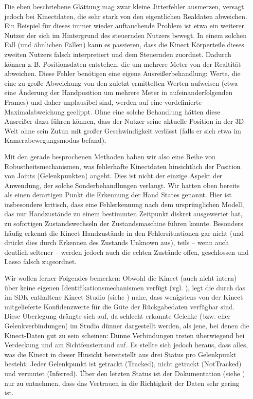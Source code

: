 	Die eben beschriebene Glättung mag zwar kleine Jitterfehler ausmerzen, versagt jedoch bei Kinectdaten, die sehr stark von den eigentlichen Realdaten abweichen. Ein Beispiel für dieses immer wieder auftauchende Problem ist etwa ein weiterer Nutzer der sich im Hintergrund des steuernden Nutzers bewegt. In einem solchen Fall (und ähnlichen Fällen) kann es passieren, dass die Kinect Körperteile dieses zweiten Nutzers falsch interpretiert und dem Steuernden zuordnet. Dadurch können z.\,B. Positionsdaten entstehen, die um mehrere Meter von der Realtität abweichen. Diese Fehler benötigen eine eigene Ausreißerbehandlung: Werte, die eine zu große Abweichung von den zuletzt ermittelten Werten aufweisen (etwa eine Änderung der Handposition um mehrere Meter in aufeinanderfolgenden Frames) und daher unplausibel sind, werden auf eine vordefinierte Maximalabweichung geclippt. Ohne eine solche Behandlung hätten diese Ausreißer dazu führen können, dass der Nutzer seine aktuelle Position in der 3D-Welt ohne sein Zutun mit großer Geschwindigkeit verlässt (falls er sich etwa im Kamerabewegungsmodus befand).\par 
	Mit den gerade besprochenen Methoden haben wir also eine Reihe von Robustheitsmechanismen, was fehlerhafte Kinectdaten hinsichtlich der Position von Joints (Gelenkpunkten) angeht. Dies ist nicht der einzige Aspekt der Anwendung, der solche Sonderbehandlungen verlangt. Wir hatten oben bereits als einen derartigen Punkt die Erkennung der \glqq Hand States\grqq{} genannt. Hier ist insbesondere kritisch, dass eine Fehlerkennung nach dem ursprünglichen Modell, das nur Handzustände zu einem bestimmten Zeitpunkt diskret ausgewertet hat, zu sofortigen Zustandswechseln der Zustandsmaschine führen konnte. Besonders häufig erkennt die Kinect Handzustände in den Fehlersituationen gar nicht (und drückt dies durch \glqq Erkennen\grqq{} des Zustands \glqq{}Unknown\grqq{} aus), teils -- wenn auch deutlich seltener -- werden jedoch auch die \glqq echten\grqq{} Zustände \glqq offen\grqq{}, \glqq geschlossen\grqq{} und \glqq Lasso\grqq{} falsch zugeordnet.\par 
	Wir wollen ferner Folgendes bemerken: Obwohl die Kinect (auch nicht intern) über keine eigenen Identifikationsmechanismen verfügt (vgl. \cite{bodyprop}), legt die durch das im SDK enthaltene Kinect Studio (siehe \cite{kinectsdk}) nahe, dass wenigstens von der Kinect mitgelieferte Konfidenzwerte für die Güte der Rückgabedaten verfügbar sind. Diese Überlegung drängte sich auf, da schlecht erkannte Gelenke (bzw. eher Gelenkverbindungen) im Studio dünner dargestellt werden, als jene, bei denen die Kinect-Daten gut zu sein scheinen: Dünne Verbindungen treten überwiegend bei Verdeckung und am Sichtfensterrand auf. Es stellte sich jedoch heraus, dass alles, was die Kinect in dieser Hinsicht bereitstellt aus drei Status pro Gelenkpunkt besteht: Jeder Gelenkpunkt ist getrackt (\glqq Tracked\grqq), nicht getrackt (\glqq NotTracked\grqq) und vermutet (\glqq Inferred\grqq). Über den letzten Status ist der Dokumentation (siehe \cite{trackingstate}) nur zu entnehmen, dass das Vertrauen in die Richtigkeit der Daten \glqq sehr gering\grqq{} ist.\par\bigskip
